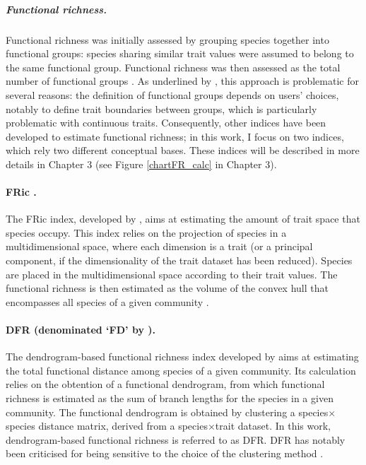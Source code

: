 \subparagraph{Functional richness.} 
Functional richness was initially assessed by grouping species together into functional groups: species sharing similar trait values were assumed to belong to the same functional group. Functional richness was then assessed as the total number of functional groups \citep{Legras2018}. As underlined by \citet{Legras2018}, this approach is problematic for several reasons: the definition of functional groups depends on users’ choices, notably to define trait boundaries between groups, which is particularly problematic with continuous traits. Consequently, other indices have been developed to estimate functional richness; in this work, I focus on two indices, which rely two different conceptual bases. These indices will be described in more details in Chapter 3 (see Figure \ref{chartFR_calc} in Chapter 3).

\paragraph{FRic \citep{Villeger2008}.}
The FRic index, developed by \citet{Villeger2008}, aims at estimating the amount of trait space that species occupy. This index relies on the projection of species in a multidimensional space, where each dimension is a trait (or a principal component, if the dimensionality of the trait dataset has been reduced). Species are placed in the multidimensional space according to their trait values. The functional richness is then estimated as the volume of the convex hull that encompasses all species of a given community \citep{Villeger2008}.
  
\paragraph{DFR (denominated `FD' by \citet{Petchey2002}).}
The dendrogram-based functional richness index developed by \citet{Petchey2002} aims at estimating the total functional distance among species of a given community. Its calculation relies on the obtention of a functional dendrogram, from which functional richness is estimated as the sum of branch lengths for the species in a given community. The functional dendrogram is obtained by clustering a species$\times$species distance matrix, derived from a species$\times$trait dataset. In this work, dendrogram-based functional richness is referred to as DFR. DFR has notably been criticised for being sensitive to the choice of the clustering method \citep{Legras2018}.
 
